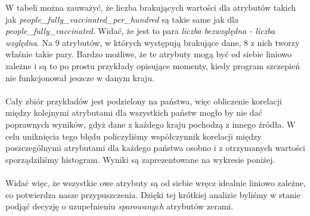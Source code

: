 \documentclass[12pt, oneside, openany]{article}
\begin{document}
W tabeli można zauważyć, że liczba brakujących wartości dla atrybutów takich jak \textit{people\_fully\_vaccinated\_per\_hundred} są takie same jak dla \textit{people\_fully\_vaccinated}. Widać, że jest to para \textit{liczba bezwzględna - liczba względna}. Na 9 atrybutów, w których występują brakujące dane, 8 z nich tworzy właśnie takie pary. Bardzo możliwe, że te atrybuty mogą być od siebie liniowo zależne i są to po prostu przykłady opisujące momenty, kiedy program szczepień nie funkcjonował jeszcze w danym kraju. 
\\
\
\\
Cały zbiór przykładów jest podzielony na państwa, więc obliczenie korelacji między kolejnymi atrybutami dla wszystkich państw mogło by nie dać poprawnych wyników, gdyż dane z każdego kraju pochodzą z innego źródła. W celu uniknięcia tego błędu policzyliśmy współczynnik korelacji między poszczególnymi atrybutami dla każdego państwa osobno i z otrzymanych wartości sporządziliśmy histogram. Wyniki są zaprezentowane na wykresie poniżej. 
\\
\
\\
Widać więc, że wszystkie owe atrybuty są od siebie wręcz idealnie liniowo zależne, co potwierdza nasze przypuszczenia. Dzięki tej krótkiej analizie byliśmy w stanie podjąć decyzję o uzupełnieniu \textit{sparowanych} atrybutów zerami.
\end{document}
